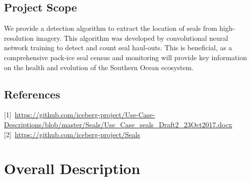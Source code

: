 \documentclass{scrreprt}
\begin{document}
\section{Project Scope}

We provide a detection algorithm to extract the location of seals from high-resolution 
imagery. This algorithm was developed by convolutional neural network training to 
detect and count seal haul-outs. This is beneficial, as a comprehensive pack-ice 
seal census and monitoring will provide key information on the health and evolution 
of the Southern Ocean ecosystem.

\section{References}
[1]~\url{https://github.com/iceberg-project/Use-Case-Descriptions/blob/master/Seals/Use_Case_seals_Draft2_23Oct2017.docx}
[2]~\url{https://github.com/iceberg-project/Seals}

\chapter{Overall Description}
\end{document}

